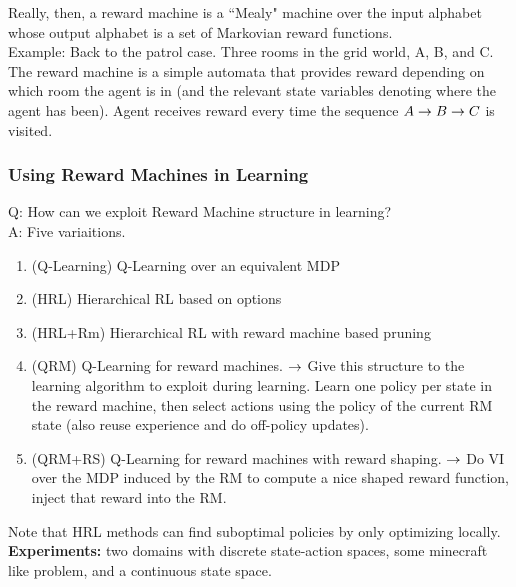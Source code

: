 
Really, then, a reward machine is a ``Mealy" machine over the input alphabet whose output alphabet is a set of Markovian reward functions.\\

Example: Back to the patrol case. Three rooms in the grid world, A, B, and C. The reward machine is a simple automata that provides reward depending on which room the agent is in (and the relevant state variables denoting where the agent has been). Agent receives reward every time the sequence $A \rightarrow B \rightarrow C$ is visited.

\subsubsection{Using Reward Machines in Learning}

Q: How can we exploit Reward Machine structure in learning? \\

A: Five variaitions.
\begin{enumerate}
\item (Q-Learning) Q-Learning over an equivalent MDP
\item (HRL) Hierarchical RL based on options
\item (HRL+Rm) Hierarchical RL with reward machine based pruning
\item (QRM) Q-Learning for reward machines.
$\rightarrow$ Give this structure to the learning algorithm to exploit during learning. Learn one policy per state in the reward machine, then select actions using the policy of the current RM state (also reuse experience and do off-policy updates).
\item (QRM+RS) Q-Learning for reward machines with reward shaping.
$\rightarrow$ Do VI over the MDP induced by the RM to compute a nice shaped reward function, inject that reward into the RM.
\end{enumerate}

Note that HRL methods can find suboptimal policies by only optimizing locally. \\

{\bf Experiments:} two domains with discrete state-action spaces, some minecraft like problem, and a continuous state space.

